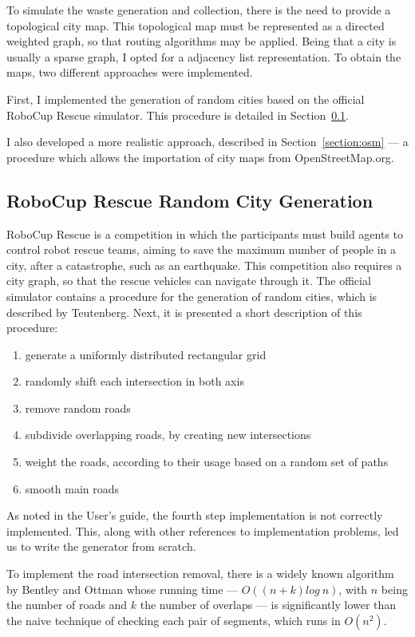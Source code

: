 To simulate the waste generation and collection, there is the need to provide a
topological city map. This topological map must be represented as a directed
weighted graph, so that routing algorithms may be applied. Being that a city is
usually a sparse graph, I opted for a adjacency list representation. To obtain
the maps, two different approaches were implemented.

First, I implemented the generation of random cities based on the official
RoboCup Rescue simulator. This procedure is detailed in
Section~\ref{section:roborescue}.

I also developed a more realistic approach, described in
Section~\ref{section:osm}  --- a procedure which allows the importation of city
maps from OpenStreetMap.org.

\subsection{RoboCup Rescue Random City Generation}
\label{section:roborescue}

RoboCup Rescue is a competition in which the participants must build agents to
control robot rescue teams, aiming to save the maximum number of people in a
city, after a catastrophe, such as an earthquake. This competition also
requires a city graph, so that the rescue vehicles can navigate through it.
The official simulator contains a procedure for the generation of random
cities, which is described by Teutenberg\citep{Teutenberg03}. Next, it is
presented a short description of this procedure:

\begin{enumerate}
	\item generate a uniformly distributed rectangular grid
	\item randomly shift each intersection in both axis
	\item remove random roads
	\item subdivide overlapping roads, by creating new intersections
	\item weight the roads, according to their usage based on a random set of paths
	\item smooth main roads
\end{enumerate}

As noted in the User's guide, the fourth step implementation is not correctly
implemented. This, along with other references to implementation problems, led
us to write the generator from scratch.

To implement the road intersection removal, there is a widely known algorithm
by Bentley and Ottman\cite{bentley-ottman} whose running time --- $O((n + k)
log~n)$, with $n$ being the number of roads and $k$ the number of overlaps ---
is significantly lower than the naive technique of checking each pair of
segments, which runs in $O(n^2)$.

